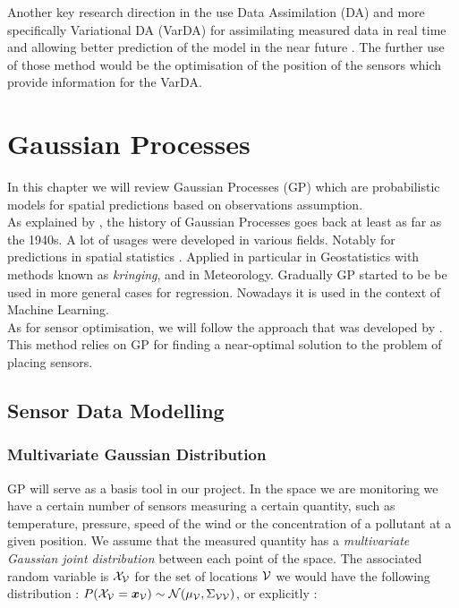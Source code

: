 \documentclass[12pt,twoside]{report}
\begin{document}
Another key research direction in the use Data Assimilation (DA) and more specifically Variational DA (VarDA) for assimilating measured data in real time and allowing better prediction of the model in the near future \citep{arcucci_effective_2018}. The further use of those method would be the optimisation of the position of the sensors which provide information for the VarDA.


\section{Gaussian Processes}

In this chapter we will review Gaussian Processes (GP) which are probabilistic models for spatial predictions based on observations assumption. \\ 

As explained by \citet[p.~29]{rasmussen_gaussian_2006}, the history of Gaussian Processes goes back at least as far as the 1940s. A lot of usages were developed in various fields. Notably for predictions in spatial statistics \citep{cressie_statistics_1991}.  Applied in particular in Geostatistics with methods known as \textit{kringing}, and in Meteorology. Gradually GP started to be be used in more general cases for regression. Nowadays it is used in the context of Machine Learning. \\

As for sensor optimisation, we will follow the approach that was developed by \citet{krause_near-optimal_2008}. This method relies on GP for finding a near-optimal solution to the problem of placing sensors. 


\subsection{Sensor Data Modelling}

\subsubsection{Multivariate Gaussian Distribution}

GP will serve as a basis tool in our project. In the space we are monitoring we have a certain number of sensors measuring a certain quantity, such as temperature, pressure, speed of the wind or the concentration of a pollutant at a given position. We assume that the measured quantity  has a \textit{multivariate Gaussian joint distribution} between each point of the space. The associated random variable is $\mathcal{X}_{\mathcal{V}}$ for the set of locations $\mathcal{V}$ we would have the following distribution : $P(\mathcal{X}_{\mathcal{V}} = {\boldsymbol{{x}}}_{\mathcal{V}}) \sim \mathcal{N}(\mu_{\mathcal{V}}, \Sigma_{\mathcal{V}\mathcal{V}}) $, or explicitly : 
\end{document}
